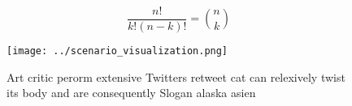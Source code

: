 \documentclass[a4paper]{article}
\begin{document}
\[ \frac{n!}{k!(n-k)!} = \binom{n}{k} \]

\begin{figure}
\centering
\texttt{[image: ../scenario\_visualization.png]}
\caption{Art critic perorm extensive Twitters retweet cat can relexively twist its body and are consequently Slogan alaska asien
}
\end{figure}
 
\end{document}
